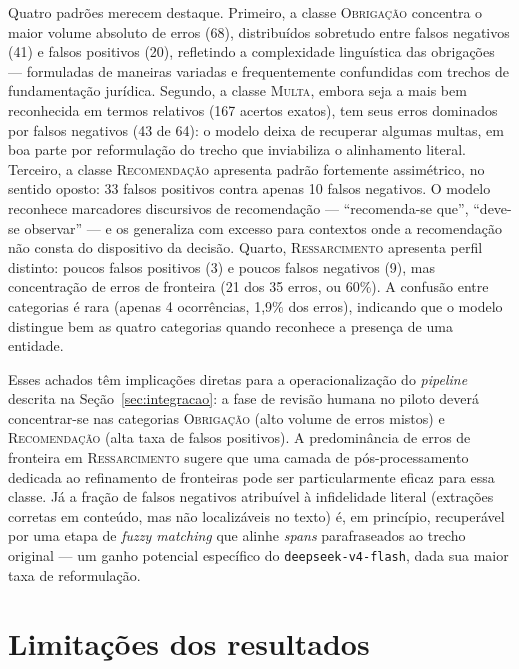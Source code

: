 Quatro padrões merecem destaque. Primeiro, a classe \textsc{Obrigação} concentra o maior volume absoluto de erros (68), distribuídos sobretudo entre falsos negativos (41) e falsos positivos (20), refletindo a complexidade linguística das obrigações --- formuladas de maneiras variadas e frequentemente confundidas com trechos de fundamentação jurídica. Segundo, a classe \textsc{Multa}, embora seja a mais bem reconhecida em termos relativos (167 acertos exatos), tem seus erros dominados por falsos negativos (43 de 64): o modelo deixa de recuperar algumas multas, em boa parte por reformulação do trecho que inviabiliza o alinhamento literal. Terceiro, a classe \textsc{Recomendação} apresenta padrão fortemente assimétrico, no sentido oposto: 33 falsos positivos contra apenas 10 falsos negativos. O modelo reconhece marcadores discursivos de recomendação --- ``recomenda-se que'', ``deve-se observar'' --- e os generaliza com excesso para contextos onde a recomendação não consta do dispositivo da decisão. Quarto, \textsc{Ressarcimento} apresenta perfil distinto: poucos falsos positivos (3) e poucos falsos negativos (9), mas concentração de erros de fronteira (21 dos 35 erros, ou 60\%). A confusão entre categorias é rara (apenas 4 ocorrências, 1,9\% dos erros), indicando que o modelo distingue bem as quatro categorias quando reconhece a presença de uma entidade.

Esses achados têm implicações diretas para a operacionalização do \textit{pipeline} descrita na Seção~\ref{sec:integracao}: a fase de revisão humana no piloto deverá concentrar-se nas categorias \textsc{Obrigação} (alto volume de erros mistos) e \textsc{Recomendação} (alta taxa de falsos positivos). A predominância de erros de fronteira em \textsc{Ressarcimento} sugere que uma camada de pós-processamento dedicada ao refinamento de fronteiras pode ser particularmente eficaz para essa classe. Já a fração de falsos negativos atribuível à infidelidade literal (extrações corretas em conteúdo, mas não localizáveis no texto) é, em princípio, recuperável por uma etapa de \textit{fuzzy matching} que alinhe \textit{spans} parafraseados ao trecho original --- um ganho potencial específico do \texttt{deepseek-v4-flash}, dada sua maior taxa de reformulação.

\section{Limitações dos resultados}
\label{sec:limitacoes_resultados}

